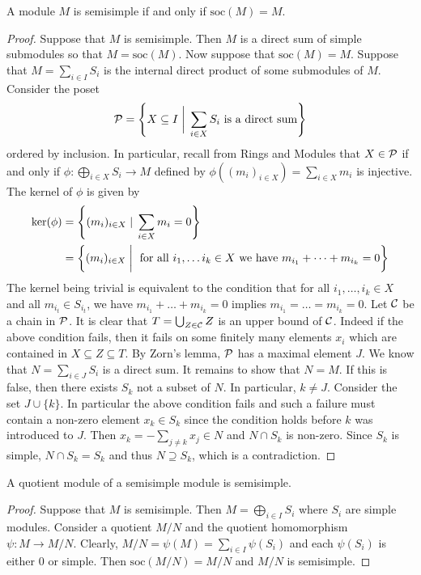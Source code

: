\documentclass[a4paper]{article}
\begin{document}
\begin{lmm}{}{} A module $M$ is semisimple if and only if $\text{soc}(M)=M$. \tcbline
\begin{proof}
Suppose that $M$ is semisimple. Then $M$ is a direct sum of simple submodules so that $M=\text{soc}(M)$. Now suppose that $\text{soc}(M)=M$. Suppose that $M=\sum_{i\in I}S_i$ is the internal direct product of some submodules of $M$. Consider the poset $$\mathcal{P}=\left\{X\subseteq I\;\bigg{|}\;\sum_{i\in X}S_i\text{ is a direct sum}\right\}$$ ordered by inclusion. In particular, recall from Rings and Modules that $X\in\mathcal{P}$ if and only if $\phi:\bigoplus_{i\in X}S_i\to M$ defined by $\phi\left((m_i)_{i\in X}\right)=\sum_{i\in X}m_i$ is injective. The kernel of $\phi$ is given by 
\begin{align*}
\ker(\phi)&=\left\{(m_i)_{i\in X}\;|\;\sum_{i\in X}m_i=0\right\}\\
&=\left\{(m_i)_{i\in X}\;\bigg{|}\;\text{ for all }i_1,\dots i_k\in X\text{ we have }m_{i_1}+\dots+m_{i_k}=0\right\}
\end{align*}
The kernel being trivial is equivalent to the condition that for all $i_1,\dots,i_k\in X$ and all $m_{i_t}\in S_{i_t}$, we have $m_{i_1}+\dots+m_{i_k}=0$ implies $m_{i_1}=\dots=m_{i_k}=0$. Let $\mathcal{C}$ be a chain in $\mathcal{P}$. It is clear that $T=\bigcup_{Z\in\mathcal{C}}Z$ is an upper bound of $\mathcal{C}$. Indeed if the above condition fails, then it fails on some finitely many elements $x_i$ which are contained in $X\subseteq Z\subseteq T$. By Zorn's lemma, $\mathcal{P}$ has a maximal element $J$. We know that $N=\sum_{i\in J}S_i$ is a direct sum. It remains to show that $N=M$. If this is false, then there exists $S_k$ not a subset of $N$. In particular, $k\neq J$. Consider the set $J\cup\{k\}$. In particular the above condition fails and such a failure must contain a non-zero element $x_k\in S_k$ since the condition holds before $k$ was introduced to $J$. Then $x_k=-\sum_{j\neq k}x_j\in N$ and $N\cap S_k$ is non-zero. Since $S_k$ is simple, $N\cap S_k=S_k$ and thus $N\supseteq S_k$, which is a contradiction. 
\end{proof}
\end{lmm}

\begin{crl}{}{} A quotient module of a semisimple module is semisimple. \tcbline
\begin{proof}
Suppose that $M$ is semisimple. Then $M=\bigoplus_{i\in I}S_i$ where $S_i$ are simple modules. Consider a quotient $M/N$ and the quotient homomorphism $\psi:M\to M/N$. Clearly, $M/N=\psi(M)=\sum_{i\in I}\psi(S_i)$ and each $\psi(S_i)$ is either $0$ or simple. Then $\text{soc}(M/N)=M/N$ and $M/N$ is semisimple. 
\end{proof}
\end{crl}
\end{document}
